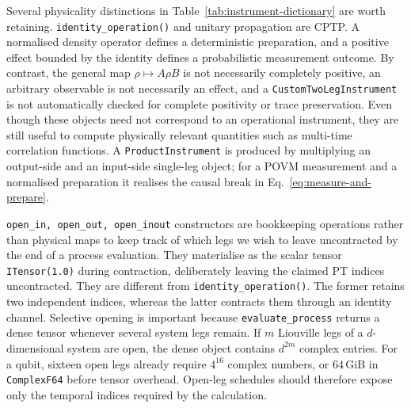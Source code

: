 %
Several physicality distinctions in Table~\ref{tab:instrument-dictionary} are worth retaining.
\texttt{identity\_operation()} and unitary propagation are CPTP.
A normalised density operator defines a deterministic preparation, and a positive effect bounded by the identity defines a probabilistic measurement outcome.
By contrast, the general map \(\rho\mapsto A\rho B\) is not necessarily completely positive, an arbitrary observable is not necessarily an effect, and a \texttt{CustomTwoLegInstrument} is not automatically checked for complete positivity or trace preservation.
Even though these objects need not correspond to an operational instrument, they are still useful to compute physically relevant quantities such as multi-time correlation functions.
A \texttt{ProductInstrument} is produced by multiplying an output-side and an input-side single-leg object; for a POVM measurement and a normalised preparation it realises the causal break in Eq.~\eqref{eq:measure-and-prepare}.

\texttt{open\_in, open\_out, open\_inout} constructors are bookkeeping operations rather than physical maps to keep track of which legs we wish to leave uncontracted by the end of a process evaluation.
They materialise as the scalar tensor \texttt{ITensor(1.0)} during contraction, deliberately leaving the claimed PT indices uncontracted.
They are different from \texttt{identity\_operation()}.
The former retains two independent indices, whereas the latter contracts them through an identity channel.
Selective opening is important because \texttt{evaluate\_process} returns a dense tensor whenever several system legs remain.
If \(m\) Liouville legs of a \(d\)-dimensional system are open, the dense object contains \(d^{2m}\) complex entries.
For a qubit, sixteen open legs already require \(4^{16}\) complex numbers, or \(64\,\mathrm{GiB}\) in \texttt{ComplexF64} before tensor overhead.
Open-leg schedules should therefore expose only the temporal indices required by the calculation.

\label{subsec:instrument-seq}

